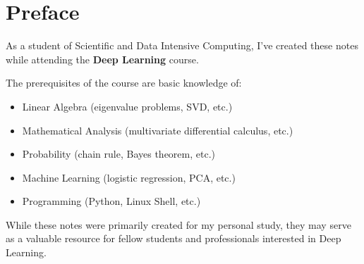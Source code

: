 \chapter*{Preface}

As a student of Scientific and Data Intensive Computing, I've created these notes while attending the \textbf{Deep Learning} course.

\vspace{0.5em}

The prerequisites of the course are basic knowledge of:

\begin{itemize}
    \item Linear Algebra (eigenvalue problems, SVD, etc.)
    \item Mathematical Analysis (multivariate differential calculus, etc.)
    \item Probability (chain rule, Bayes theorem, etc.)
    \item Machine Learning (logistic regression, PCA, etc.)
    \item Programming (Python, Linux Shell, etc.)
\end{itemize}

\vspace{0.5em}

While these notes were primarily created for my personal study, they may serve as a valuable resource for fellow students and professionals interested in Deep Learning.